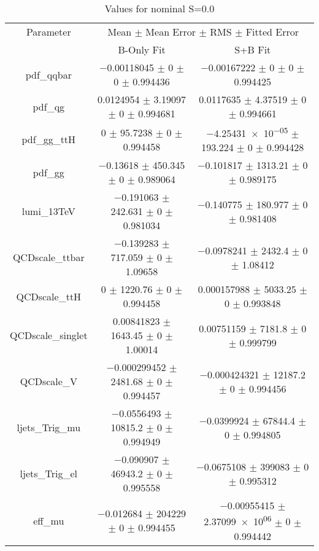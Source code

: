 \begin{table}
\centering
\caption{Values for nominal S=0.0}
\begin{tabular}{ccc}
\toprule
Parameter & \multicolumn{2}{c}{Mean $\pm$ Mean Error $\pm$ RMS $\pm$ Fitted Error}\\
 & B-Only Fit & S+B Fit\\
\midrule
pdf\_qqbar & \num{-0.00118045} $\pm$ \num{0} $\pm$ \num{0} $\pm$ \num{0.994436} & \num{-0.00167222} $\pm$ \num{0} $\pm$ \num{0} $\pm$ \num{0.994425}\\
pdf\_qg & \num{0.0124954} $\pm$ \num{3.19097} $\pm$ \num{0} $\pm$ \num{0.994681} & \num{0.0117635} $\pm$ \num{4.37519} $\pm$ \num{0} $\pm$ \num{0.994661}\\
pdf\_gg\_ttH & \num{0} $\pm$ \num{95.7238} $\pm$ \num{0} $\pm$ \num{0.994458} & \num{-4.25431e-05} $\pm$ \num{193.224} $\pm$ \num{0} $\pm$ \num{0.994428}\\
pdf\_gg & \num{-0.13618} $\pm$ \num{450.345} $\pm$ \num{0} $\pm$ \num{0.989064} & \num{-0.101817} $\pm$ \num{1313.21} $\pm$ \num{0} $\pm$ \num{0.989175}\\
lumi\_13TeV & \num{-0.191063} $\pm$ \num{242.631} $\pm$ \num{0} $\pm$ \num{0.981034} & \num{-0.140775} $\pm$ \num{180.977} $\pm$ \num{0} $\pm$ \num{0.981408}\\
QCDscale\_ttbar & \num{-0.139283} $\pm$ \num{717.059} $\pm$ \num{0} $\pm$ \num{1.09658} & \num{-0.0978241} $\pm$ \num{2432.4} $\pm$ \num{0} $\pm$ \num{1.08412}\\
QCDscale\_ttH & \num{0} $\pm$ \num{1220.76} $\pm$ \num{0} $\pm$ \num{0.994458} & \num{0.000157988} $\pm$ \num{5033.25} $\pm$ \num{0} $\pm$ \num{0.993848}\\
QCDscale\_singlet & \num{0.00841823} $\pm$ \num{1643.45} $\pm$ \num{0} $\pm$ \num{1.00014} & \num{0.00751159} $\pm$ \num{7181.8} $\pm$ \num{0} $\pm$ \num{0.999799}\\
QCDscale\_V & \num{-0.000299452} $\pm$ \num{2481.68} $\pm$ \num{0} $\pm$ \num{0.994457} & \num{-0.000424321} $\pm$ \num{12187.2} $\pm$ \num{0} $\pm$ \num{0.994456}\\
ljets\_Trig\_mu & \num{-0.0556493} $\pm$ \num{10815.2} $\pm$ \num{0} $\pm$ \num{0.994949} & \num{-0.0399924} $\pm$ \num{67844.4} $\pm$ \num{0} $\pm$ \num{0.994805}\\
ljets\_Trig\_el & \num{-0.090907} $\pm$ \num{46943.2} $\pm$ \num{0} $\pm$ \num{0.995558} & \num{-0.0675108} $\pm$ \num{399083} $\pm$ \num{0} $\pm$ \num{0.995312}\\
eff\_mu & \num{-0.012684} $\pm$ \num{204229} $\pm$ \num{0} $\pm$ \num{0.994455} & \num{-0.00955415} $\pm$ \num{2.37099e+06} $\pm$ \num{0} $\pm$ \num{0.994442}\\

\end{tabular}
\end{table}
